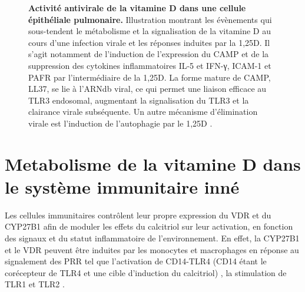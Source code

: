 \documentclass[
  a4paper,
  DIV=11,
  numbers=noendperiod,
  listof=totoc]{scrreprt}
\begin{document}
\begin{figure}


\caption[Activité antivirale de la vitamine D dans une cellule
épithéliale pulmonaire.]{\label{fig-vd-antiviral}\textbf{Activité
antivirale de la vitamine D dans une cellule épithéliale pulmonaire.}
Illustration montrant les évènements qui sous-tendent le métabolisme et
la signalisation de la vitamine D au cours d'une infection virale et les
réponses induites par la 1,25D. Il s'agit notamment de l'induction de
l'expression du CAMP et de la suppression des cytokines inflammatoires
IL-5 et IFN-γ, ICAM-1 et PAFR par l'intermédiaire de la 1,25D. La forme
mature de CAMP, LL37, se lie à l'ARNdb viral, ce qui permet une liaison
efficace au TLR3 endosomal, augmentant la signalisation du TLR3 et la
clairance virale subséquente. Un autre mécanisme d'élimination virale
est l'induction de l'autophagie par le 1,25D \autocite{Ismailova.2022}.}

\end{figure}%

\section{Metabolisme de la vitamine D dans le système immunitaire
inné}\label{metabolisme-de-la-vitamine-d-dans-le-systuxe8me-immunitaire-innuxe9}

Les cellules immunitaires contrôlent leur propre expression du \ac{VDR}
et du \ac{CYP27B1} afin de moduler les effets du calcitriol sur leur
activation, en fonction des signaux et du statut inflammatoire de
l'environnement. En effet, la \ac{CYP27B1} et le \ac{VDR} peuvent être
induites par les monocytes et macrophages en réponse au signalement des
\ac{PRR} tel que l'activation de CD14-TLR4 (CD14 étant le corécepteur de
TLR4 et une cible d'induction du calcitriol) \autocite{Stoffels.2009},
la stimulation de TLR1 et TLR2 \autocite{Liu.2006}.
\end{document}
